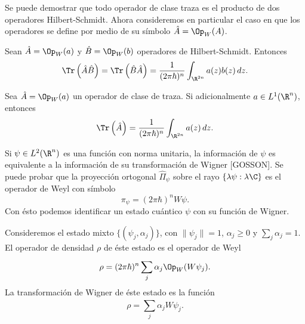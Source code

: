  Se puede demostrar que todo operador de clase traza es el
  producto de dos operadores Hilbert-Schmidt. Ahora
  consideremos en particular el caso en que los operadores
  se define por medio de su símbolo $\hat{A} = \Op_W(A)$.

  \begin{proposition}
    Sean $\hat{A} = \Op_W(a)$ y $\hat{B} = \Op_W(b)$
    operadores de Hilbert-Schmidt. Entonces
    \begin{equation}
      \Tr\left( \hat{A}\hat{B} \right) 
      = \Tr\left( \hat{B}\hat{A} \right) 
      = \frac{1}{(2\pi\hbar)^{n}} \int_{\R^{2n}} a(z)b(z) \,
      dz.
    \end{equation}
  \end{proposition}

  \begin{proposition}
    Sea $\hat{A} = \Op_W(a)$ un operador de clase de traza.
    Si adicionalmente $a \in L^{1}(\R^{n})$, entonces
    \begin{equation}
      \Tr\left( \hat{A} \right) 
      = \frac{1}{(2\pi\hbar)^{n}} \int_{\R^{2n}} a(z) \, dz.
    \end{equation}
  \end{proposition}

  Si $\psi \in L^2(\R^{n})$ es una función con norma
  unitaria, la información de $\psi$ es equivalente a la
  información de su transformación de Wigner [GOSSON]. Se
  puede probar que la proyección ortogonal $\hat{\Pi}_\psi$ 
  sobre el rayo $\{\lambda \psi : \lambda \C\}$ es el
  operador de Weyl con símbolo
  \[
    \pi_\psi = (2\pi\hbar)^{n}W\psi.
  \] 
  Con ésto podemos identificar un estado cuántico $\psi$ con
  su función de Wigner.

  \begin{definition}
    Consideremos el estado mixto $\{(\psi_j,\alpha_j)\}$,
    con $\|\psi_j\| = 1$, $\alpha_j \geq 0$ y $\sum_{j}^{}
    \alpha_j = 1$. El operador de densidad $\rho$ de
    éste estado es el operador de Weyl
    \begin{equation}
      \rho
      = (2\pi\hbar)^{n} \sum_{j}^{} \alpha_j \Op_W(W\psi_j).
    \end{equation}
    La transformación de Wigner de éste estado es la función
    \begin{equation}
      \rho = \sum_{j}^{} \alpha_j W\psi_j.
    \end{equation}
  \end{definition}

